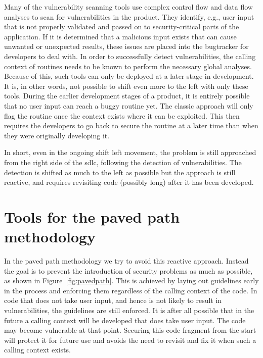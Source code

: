 Many of the vulnerability scanning tools use complex control flow and data flow analyses to scan for vulnerabilities in the product. They identify, e.g., user input that is not properly validated and passed on to security-critical parts of the application. If it is determined that a malicious input exists that can cause unwanted or unexpected results, these issues are placed into the \gls{bugtracker} for developers to deal with. In order to successfully detect vulnerabilities, the calling context of routines needs to be known to perform the necessary global analyses. Because of this, such tools can only be deployed at a later stage in development. It is, in other words, not possible to shift even more to the left with only these tools. During the earlier development stages of a product, it is entirely possible that no user input can reach a buggy routine yet. The classic approach will only flag the routine once the context exists where it can be exploited. This then requires the developers to go back to secure the routine at a later time than when they were originally developing it. 

In short, even in the ongoing shift left movement, the problem is still approached from the right side of the \gls{sdlc}, following the detection of vulnerabilities. The detection is shifted as much to the left as possible but the approach is still reactive, and requires revisiting code (possibly long) after it has been developed. 

\section{Tools for the paved path methodology}
In the paved path methodology we try to avoid this reactive approach.
Instead the goal is to prevent the introduction of \glspl{security problem} as much as possible, as shown in Figure~\ref{fig:pavedpath}.
This is achieved by laying out guidelines early in the process and enforcing them regardless of the calling context of the code. 
In code that does not take user input, and hence is not likely to result in vulnerabilities, the guidelines are still enforced.
It is after all possible that in the future a calling context will be developed that does take user input.
The code may become vulnerable at that point.
Securing this code fragment from the start will protect it for future use and avoids the need to revisit and fix it when such a calling context exists. 

